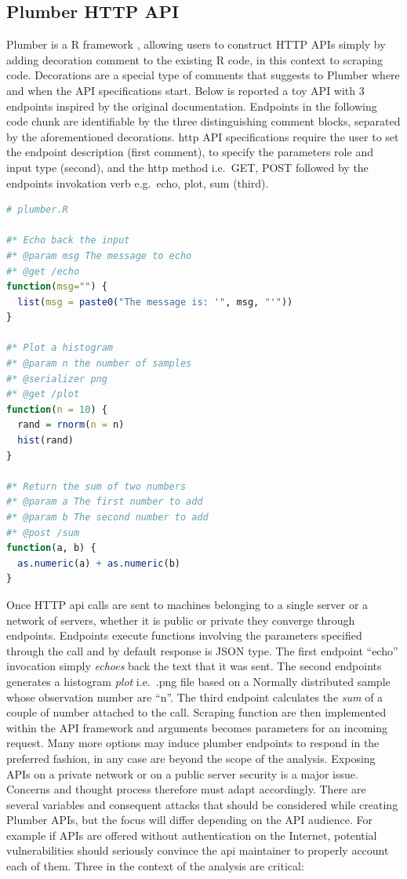 \documentclass[
  12pt,
  a4paper,
  oneside]{book}
\theoremstyle{definition}
\theoremstyle{definition}
\theoremstyle{definition}
\theoremstyle{remark}
\begin{document}
\hypertarget{plumberapi}{%
\subsection{Plumber HTTP API}\label{plumberapi}}

Plumber is a R framework \citep{plumber}, allowing users to construct HTTP APIs simply by adding decoration comment to the existing R code, in this context to scraping code. Decorations are a special type of comments that suggests to Plumber where and when the API specifications start. Below is reported a toy API with 3 endpoints inspired by the original documentation. Endpoints in the following code chunk are identifiable by the three distinguishing comment blocks, separated by the aforementioned decorations. http API specifications require the user to set the endpoint description (first comment), to specify the parameters role and input type (second), and the http method i.e.~GET, POST followed by the endpoints invokation verb e.g.~echo, plot, sum (third).

\begin{lstlisting}[language=R]
# plumber.R

#* Echo back the input
#* @param msg The message to echo
#* @get /echo
function(msg="") {
  list(msg = paste0("The message is: '", msg, "'"))
}

#* Plot a histogram
#* @param n the number of samples
#* @serializer png
#* @get /plot
function(n = 10) {
  rand = rnorm(n = n)
  hist(rand)
}

#* Return the sum of two numbers
#* @param a The first number to add
#* @param b The second number to add
#* @post /sum
function(a, b) {
  as.numeric(a) + as.numeric(b)
}
\end{lstlisting}

Once HTTP api calls are sent to machines belonging to a single server or a network of servers, whether it is public or private they converge through endpoints. Endpoints execute functions involving the parameters specified through the call and by default response is JSON type. The first endpoint ``echo'' invocation simply \emph{echoes} back the text that it was sent. The second endpoints generates a histogram \emph{plot} i.e.~.png file based on a Normally distributed sample whose observation number are ``n''. The third endpoint calculates the \emph{sum} of a couple of number attached to the call. Scraping function are then implemented within the API framework and arguments becomes parameters for an incoming request. Many more options may induce plumber endpoints to respond in the preferred fashion, in any case are beyond the scope of the analysis.
Exposing APIs on a private network or on a public server security is a major issue. Concerns and thought process therefore must adapt accordingly. There are several variables and consequent attacks that should be considered while creating Plumber APIs, but the focus will differ depending on the API audience. For example if APIs are offered without authentication on the Internet, potential vulnerabilities should seriously convince the api maintainer to properly account each of them. Three in the context of the analysis are critical:
\end{document}
